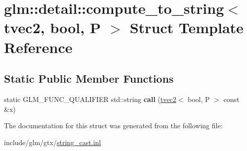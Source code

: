 \hypertarget{structglm_1_1detail_1_1compute__to__string_3_01tvec2_00_01bool_00_01P_01_4}{}\section{glm\+:\+:detail\+:\+:compute\+\_\+to\+\_\+string$<$ tvec2, bool, P $>$ Struct Template Reference}
\label{structglm_1_1detail_1_1compute__to__string_3_01tvec2_00_01bool_00_01P_01_4}
\subsection*{Static Public Member Functions}
\begin{DoxyCompactItemize}
\item 
\mbox{\label{structglm_1_1detail_1_1compute__to__string_3_01tvec2_00_01bool_00_01P_01_4_a860277b13f804aa978482f1bed3de777}} 
static G\+L\+M\+\_\+\+F\+U\+N\+C\+\_\+\+Q\+U\+A\+L\+I\+F\+I\+ER std\+::string {\bfseries call} (\hyperlink{structglm_1_1tvec2}{tvec2}$<$ bool, P $>$ const \&x)
\end{DoxyCompactItemize}


The documentation for this struct was generated from the following file\+:\begin{DoxyCompactItemize}
\item 
include/glm/gtx/\hyperlink{string__cast_8inl}{string\+\_\+cast.\+inl}\end{DoxyCompactItemize}
